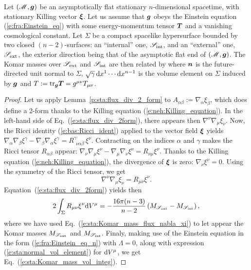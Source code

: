 \begin{prop}
\label{p:sta:Komar_mass_vol_integ}
Let $(\mathscr{M}, \bm{g})$ be an asymptotically flat stationary $n$-dimensional spacetime,
with stationary Killing vector $\bm{\xi}$. Let us assume that $\bm{g}$
obeys the Einstein equation (\ref{e:fra:Einstein_eq}) with some energy-momentum
tensor $\bm{T}$ and a vanishing cosmological constant.
Let $\Sigma$ be a compact spacelike hypersurface bounded by two closed $(n-2)$-surfaces:
an ``internal'' one, $\mathscr{S}_{\rm int}$, and an ``external'' one,
$\mathscr{S}_{\rm ext}$, the exterior direction being that of the asymptotic flat end of $(\mathscr{M}, \bm{g})$.
The Komar masses over $\mathscr{S}_{\rm ext}$ and $\mathscr{S}_{\rm int}$ are then
related by
\be \label{e:sta:Komar_mass_vol_integ}
\ee
where $\bm{n}$ is the future-directed unit normal to $\Sigma$,
$\sqrt{\gamma}\,\mathrm{d} x^1 \cdots \mathrm{d} x^{n-1}$ is the volume element on $\Sigma$
induced by $\bm{g}$ and $T:= \mathrm{tr}_{\bm{g}} \bm{T} = g^{\mu\nu} T_{\mu\nu}$.
\end{prop}
\begin{proof}
Let us apply Lemma~\ref{p:sta:flux_div_2_form} to $A_{\alpha\beta} := \nabla_\alpha \xi_\beta$,
which does define a 2-form thanks to the  Killing equation (\ref{e:neh:Killing_equation}).
In the left-hand side of Eq.~(\ref{e:sta:flux_div_2form}), there appears then
$\nabla^\nu \nabla_\mu \xi_\nu$. Now, the Ricci identity (\ref{e:bas:Ricci_ident})
applied to the vector field $\bm{\xi}$ yields
$\nabla_\alpha \nabla_\beta \xi^\gamma - \nabla_\beta \nabla_\alpha \xi^\gamma
= R^\gamma_{\ \  \nu \alpha\beta} \, \xi^\nu$. Contracting on the indices
$\alpha$ and $\gamma$ makes the Ricci tensor $R_{\alpha\beta}$ appear:
$\nabla_\nu \nabla_\mu \xi^\nu - \nabla_\mu \nabla_\nu \xi^\nu = R_{\nu\mu} \xi^\nu$.
Thanks to the Killing equation (\ref{e:neh:Killing_equation}), the divergence
of $\bm{\xi}$ is zero: $\nabla_\nu \xi^\nu = 0$. Using the symmetry of the Ricci tensor,
we get
\[
    \nabla^\nu \nabla_\mu \xi_\nu = R_{\mu\nu} \xi^\nu .
\]
Equation~(\ref{e:sta:flux_div_2form}) yields then
\[
    2 \int_{\Sigma} R_{\mu\nu} \xi^\nu \mathrm{d} V^\mu =
    - \frac{16\pi(n-3)}{n-2} \left( M_{\mathscr{S}_{\rm ext}} -  M_{\mathscr{S}_{\rm int}} \right),
\]
where we have used Eq.~(\ref{e:sta:Komar_mass_flux_nabla_xi})
to let appear the Komar masses $M_{\mathscr{S}_{\rm ext}}$ and $M_{\mathscr{S}_{\rm int}}$.
Finaly, making use of the Einstein equation in the form
(\ref{e:fra:Einstein_eq_n}) with $\Lambda=0$, along with expression
(\ref{e:sta:normal_vol_element}) for $\mathrm{d} V^\mu$, we get
Eq.~(\ref{e:sta:Komar_mass_vol_integ}).
\end{proof}

